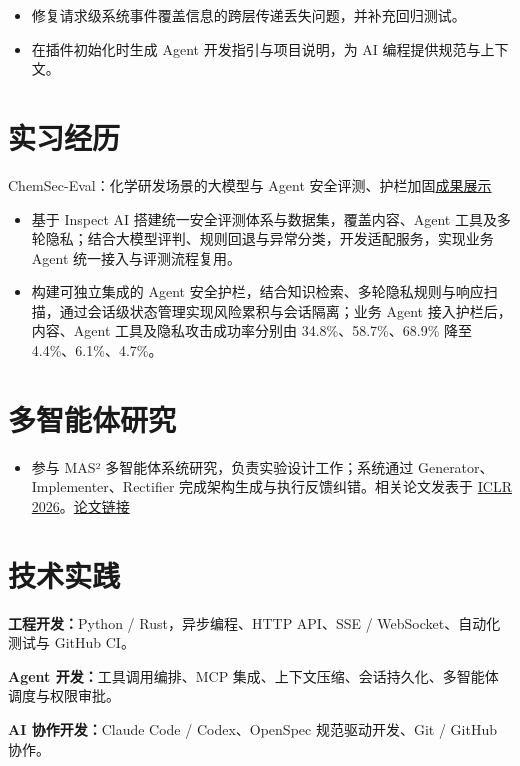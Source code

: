 \documentclass{resume}
\newcommand{\metainfo}[1]{{\fontsize{9.6}{13.7}\selectfont\color{muted}#1\par}\vspace{1.5pt}}
\newcommand{\projectlink}[2]{\href{#1}{\textcolor{muted}{#2}}}
\newcommand{\cvsection}[2]{\section{\texorpdfstring{\makebox[1.35em][l]{\normalfont #1}}{}#2}}
\begin{document}
\begin{itemize}
  \item 修复请求级系统事件覆盖信息的跨层传递丢失问题，并补充回归测试。
  \item 在插件初始化时生成 Agent 开发指引与项目说明，为 AI 编程提供规范与上下文。
\end{itemize}

\cvsection{\faBriefcase}{实习经历}
\metainfo{ChemSec-Eval：化学研发场景的大模型与 Agent 安全评测、护栏加固\quad\projectlink{https://1371149.github.io/jingtai.github.io/}{成果展示}}
\begin{itemize}
  \item 基于 Inspect AI 搭建统一安全评测体系与数据集，覆盖内容、Agent 工具及多轮隐私；结合大模型评判、规则回退与异常分类，开发适配服务，实现业务 Agent 统一接入与评测流程复用。
  \item 构建可独立集成的 Agent 安全护栏，结合知识检索、多轮隐私规则与响应扫描，通过会话级状态管理实现风险累积与会话隔离；业务 Agent 接入护栏后，内容、Agent 工具及隐私攻击成功率分别由 \mbox{34.8\%、58.7\%、68.9\%} 降至 \mbox{4.4\%、6.1\%、4.7\%。}
\end{itemize}

\cvsection{\faFlask}{多智能体研究}
\begin{itemize}
  \item 参与 MAS² 多智能体系统研究，负责实验设计工作；系统通过 Generator、Implementer、Rectifier 完成架构生成与执行反馈纠错。相关论文发表于 \href{https://iclr.cc/virtual/2026/poster/10007200}{ICLR 2026}。\quad\projectlink{https://openreview.net/forum?id=qumy27hMDY}{论文链接}
\end{itemize}

\cvsection{\faCogs}{技术实践}
\textbf{工程开发：}Python / Rust，异步编程、HTTP API、SSE / WebSocket、自动化测试与 GitHub CI。\par
\textbf{Agent 开发：}工具调用编排、MCP 集成、上下文压缩、会话持久化、\mbox{多智能体调度与权限审批。}\par
\textbf{AI 协作开发：}Claude Code / Codex、OpenSpec 规范驱动开发、Git / GitHub 协作。
\end{document}
